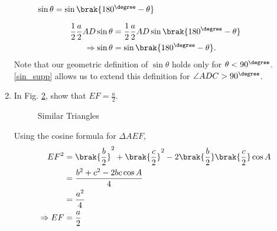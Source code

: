 \begin{enumerate}[label=\arabic*.,ref=\thesubsection.\theenumi]
\begin{figure}[!ht]
\begin{center}
		\resizebox{\columnwidth}{!}{}
	\end{center}
	\caption{$\sin \theta = \sin \brak{180^{\degree}-\theta}$}
	\label{ch2_supp_sin}	
\end{figure}

\begin{align}
\frac{1}{2}\frac{a}{2}AD \sin \theta &= \frac{1}{2}\frac{a}{2}AD \sin \brak{180^{\degree}-\theta} \\
\Rightarrow \sin \theta &= \sin \brak{180^{\degree} - \theta}.
\label{sin_supp}
\end{align}
Note that our geometric definition of $\sin \theta$ holds only for $\theta < 90^{\degree}$.  \eqref{sin_supp} allows us to extend this definition for $\angle ADC > 90^{\degree}$.



%
%
\item
	In Fig. \ref{ch2_sim_triang}, show that $EF = \frac{a}{2}$.  

%
\begin{figure}[!ht]
	\begin{center}
		
		\resizebox{\columnwidth}{!}{}
	\end{center}
	\caption{Similar Triangles}
	\label{ch2_sim_triang}	
\end{figure}

\solution Using the cosine formula for $\Delta AEF$,
%
\begin{align}
EF^2 &= \brak{\frac{b}{2}}^2 + \brak{\frac{c}{2}}^2 - 2 \brak{\frac{b}{2}}\brak{\frac{c}{2}} \cos A \\
&= \frac{b^2 + c^2 - 2bc \cos A}{4} \\
&= \frac{a^2}{4} \\
\Rightarrow EF &= \frac{a}{2}
\end{align}
%


\end{enumerate}
